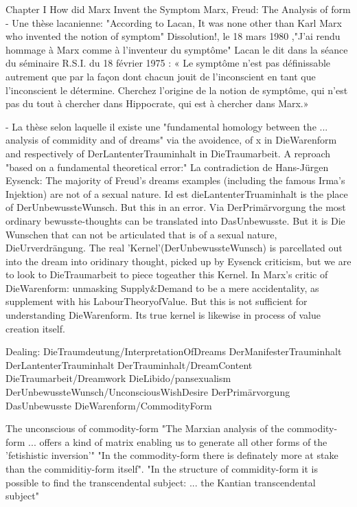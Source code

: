 
Chapter I How did Marx Invent the Symptom
Marx, Freud: The Analysis of form
- Une thèse lacanienne: "According to Lacan, It was none other than Karl Marx who invented the notion of symptom"
Dissolution!, le 18 mars 1980 ,"J’ai rendu hommage à Marx comme à l’inventeur du symptôme"
Lacan le dit dans la séance du séminaire R.S.I. du 18 février 1975 : « Le symptôme n’est pas définissable autrement que par la façon dont chacun jouit de l’inconscient en tant que l’inconscient le détermine. Cherchez l’origine de la notion de symptôme, qui n’est pas du tout à chercher dans Hippocrate, qui est à chercher dans Marx.»

- La thèse selon laquelle il existe une "fundamental homology between the ... analysis of commidity and of dreams" via the avoidence, of x in DieWarenform and respectively of DerLantenterTrauminhalt in DieTraumarbeit.
A reproach "based on a fundamental theoretical error:" La contradiction de Hans-Jürgen Eysenck: The majority of Freud's dreams examples (including the famous Irma's Injektion) are not of a sexual nature. Id est dieLantenterTruaminhalt is the place of DerUnbewussteWunsch. But this in an error. Via DerPrimärvorgung the most ordinary bewusste-thoughts can be translated into DasUnbewusste. But it is Die Wunschen that can not be articulated that is of a sexual nature, DieUrverdrängung. 
The real 'Kernel'(DerUnbewussteWunsch) is parcellated out into the dream into oridinary thought, picked up by Eysenck criticism, but we are to look to DieTraumarbeit to piece togeather this Kernel.
In Marx's critic of DieWarenform: unmasking Supply&Demand to be a mere accidentality, as supplement with his LabourTheoryofValue. But this is not sufficient for understanding DieWarenform. Its true kernel is likewise in process of value creation itself.


Dealing: DieTraumdeutung/InterpretationOfDreams DerManifesterTrauminhalt DerLantenterTrauminhalt DerTrauminhalt/DreamContent DieTraumarbeit/Dreamwork DieLibido/pansexualism DerUnbewussteWunsch/UnconsciousWishDesire DerPrimärvorgung DasUnbewusste
 DieWarenform/CommodityForm 


The unconscious of commodity-form
"The Marxian analysis of the commodity-form ... offers a kind of matrix enabling us to generate all other forms of the 'fetishistic inversion'"
"In the commodity-form there is definately more at stake than the commiditiy-form itself". "In the structure of commidity-form it is possible to find the transcendental subject: ... the Kantian transcendental subject"

